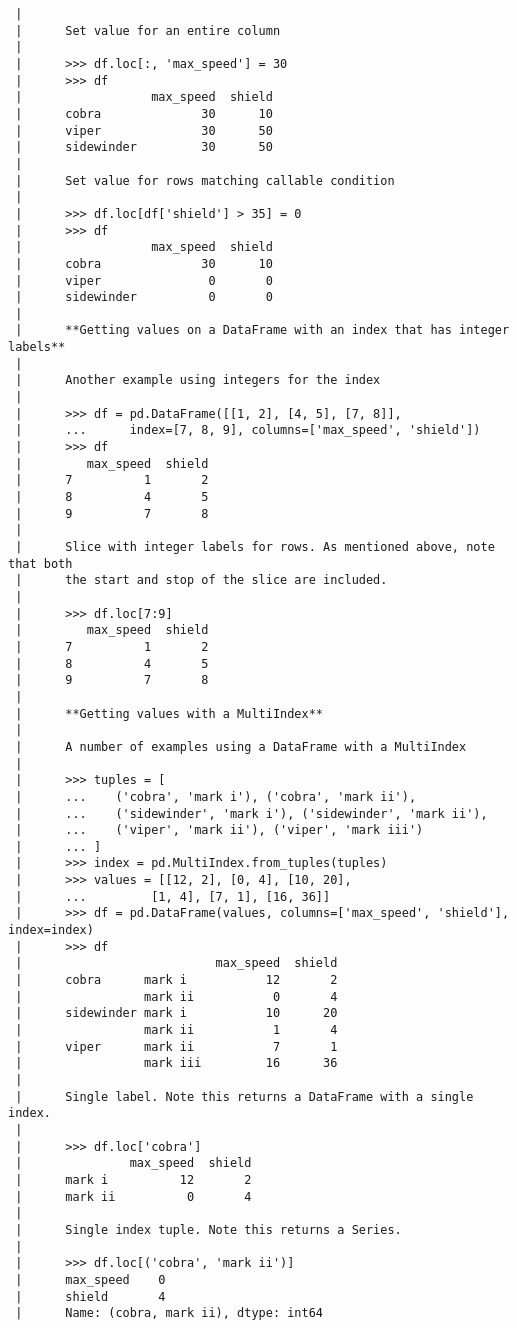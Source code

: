 \documentclass[
  letterpaper,
  DIV=11,
  numbers=noendperiod]{scrreprt}
\begin{document}
\begin{verbatim}
 |      
 |      Set value for an entire column
 |      
 |      >>> df.loc[:, 'max_speed'] = 30
 |      >>> df
 |                  max_speed  shield
 |      cobra              30      10
 |      viper              30      50
 |      sidewinder         30      50
 |      
 |      Set value for rows matching callable condition
 |      
 |      >>> df.loc[df['shield'] > 35] = 0
 |      >>> df
 |                  max_speed  shield
 |      cobra              30      10
 |      viper               0       0
 |      sidewinder          0       0
 |      
 |      **Getting values on a DataFrame with an index that has integer labels**
 |      
 |      Another example using integers for the index
 |      
 |      >>> df = pd.DataFrame([[1, 2], [4, 5], [7, 8]],
 |      ...      index=[7, 8, 9], columns=['max_speed', 'shield'])
 |      >>> df
 |         max_speed  shield
 |      7          1       2
 |      8          4       5
 |      9          7       8
 |      
 |      Slice with integer labels for rows. As mentioned above, note that both
 |      the start and stop of the slice are included.
 |      
 |      >>> df.loc[7:9]
 |         max_speed  shield
 |      7          1       2
 |      8          4       5
 |      9          7       8
 |      
 |      **Getting values with a MultiIndex**
 |      
 |      A number of examples using a DataFrame with a MultiIndex
 |      
 |      >>> tuples = [
 |      ...    ('cobra', 'mark i'), ('cobra', 'mark ii'),
 |      ...    ('sidewinder', 'mark i'), ('sidewinder', 'mark ii'),
 |      ...    ('viper', 'mark ii'), ('viper', 'mark iii')
 |      ... ]
 |      >>> index = pd.MultiIndex.from_tuples(tuples)
 |      >>> values = [[12, 2], [0, 4], [10, 20],
 |      ...         [1, 4], [7, 1], [16, 36]]
 |      >>> df = pd.DataFrame(values, columns=['max_speed', 'shield'], index=index)
 |      >>> df
 |                           max_speed  shield
 |      cobra      mark i           12       2
 |                 mark ii           0       4
 |      sidewinder mark i           10      20
 |                 mark ii           1       4
 |      viper      mark ii           7       1
 |                 mark iii         16      36
 |      
 |      Single label. Note this returns a DataFrame with a single index.
 |      
 |      >>> df.loc['cobra']
 |               max_speed  shield
 |      mark i          12       2
 |      mark ii          0       4
 |      
 |      Single index tuple. Note this returns a Series.
 |      
 |      >>> df.loc[('cobra', 'mark ii')]
 |      max_speed    0
 |      shield       4
 |      Name: (cobra, mark ii), dtype: int64

\end{verbatim}
\end{document}
